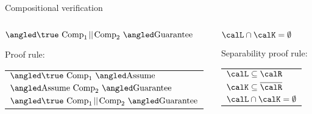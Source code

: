 \documentclass[../talk.tex]{subfiles}
\begin{document}
\begin{frame}{Compositional verification}
    \begin{overlayarea}{\slidewidth}{\slideheight}
        \begin{columns}[t,onlytextwidth]%
            \begin{column}{0.6\textwidth}%

                \(
                    \relyguarantee{\true}{\text{Comp}_1 \!\mid\mid\! \text{Comp}_2}
                    {\text{Guarantee}}
                \)

                    \vspace*{1em}

                    Proof rule:

                    \vspace*{1em}

                    \begin{tabular}{l}
                        $\relyguarantee{\true}{\text{Comp}_1}{\text{Assume}}$
                        \\
                        $\relyguarantee{\text{Assume}}{\text{Comp}_2}{\text{Guarantee}}$
                        \\
                        \cline{1-1}
                        $\relyguarantee{\true}{\text{Comp}_1 \!\mid\mid\! \text{Comp}_2 }{\text{Guarantee}}$
                    \end{tabular}

            \end{column}%
            \begin{column}{0.4\textwidth}%
                    \(
                        \calL \cap \calK
                        = \emptyset
                    \)

                    \vspace*{1em}

                    \alert{Separability} proof rule:

                    \vspace*{1em}

                    \begin{tabular}{l}
                        $\calL \subseteq \calR$
                        \\
                        $\calK \subseteq \overline{\calR}$
                        \\
                        \cline{1-1}
                        $\calL \cap \calK
                        = \emptyset$
                    \end{tabular}
            \end{column}
        \end{columns}


\end{overlayarea}
\end{frame}
\end{document}
